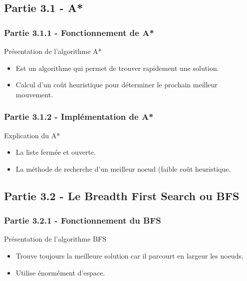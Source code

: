 \documentclass{beamer} %
\begin{document}
	\subsection{Partie 3.1 - A*}
		\subsubsection{Partie 3.1.1 - Fonctionnement de A*}
\begin{frame}[plain]
\begin{exampleblock}{Présentation de l'algorithme A*}
	\begin{itemize}
		\item Est un algorithme qui permet de trouver rapidement une solution.
		\item Calcul d'un coût heuristique pour déterminer le prochain meilleur mouvement.
	\end{itemize}
\end{exampleblock}


\end{frame}
		\subsubsection{Partie 3.1.2 - Implémentation de A*}
\begin{frame}[plain]
\begin{alertblock}{Explication du A*}
	\begin{itemize}
		\item La liste fermée et ouverte.
		\item La méthode de recherche d'un meilleur noeud (faible coût heuristique.
	\end{itemize}
\end{alertblock}
\end{frame}

	\subsection{Partie 3.2 - Le Breadth First Search ou BFS}
		\subsubsection{Partie 3.2.1 - Fonctionnement du BFS}
\begin{frame}[plain]
\begin{exampleblock}{Présentation de l'algorithme BFS}
	\begin{itemize}
		\item Trouve toujours la meilleure solution car il parcourt en largeur les noeuds.
		\item Utilise énormément d'espace.
	\end{itemize}
\end{exampleblock}
\end{frame}
\end{document}
